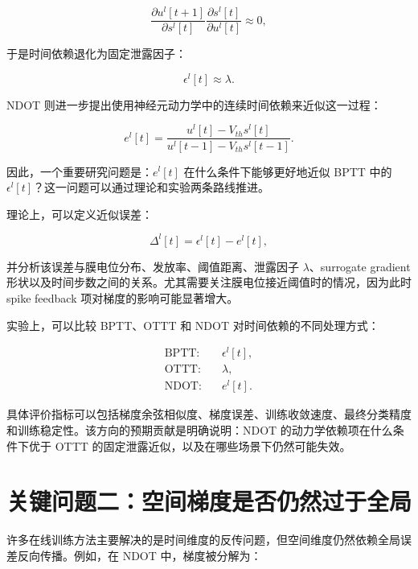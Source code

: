 \documentclass[11pt]{ctexart}
\begin{document}
\begin{equation}
\frac{\partial u^l[t+1]}{\partial s^l[t]}
\frac{\partial s^l[t]}{\partial u^l[t]}
\approx 0,
\end{equation}

于是时间依赖退化为固定泄露因子：

\begin{equation}
\epsilon^l[t] \approx \lambda .
\end{equation}

NDOT 则进一步提出使用神经元动力学中的连续时间依赖来近似这一过程：

\begin{equation}
 e^l[t]
=
\frac{u^l[t]-V_{th}s^l[t]}
{u^l[t-1]-V_{th}s^l[t-1]} .
\end{equation}

因此，一个重要研究问题是：$e^l[t]$ 在什么条件下能够更好地近似 BPTT 中的 $\epsilon^l[t]$？这一问题可以通过理论和实验两条路线推进。

理论上，可以定义近似误差：

\begin{equation}
\Delta^l[t] = \epsilon^l[t] - e^l[t],
\end{equation}

并分析该误差与膜电位分布、发放率、阈值距离、泄露因子 $\lambda$、surrogate gradient 形状以及时间步数之间的关系。尤其需要关注膜电位接近阈值时的情况，因为此时 spike feedback 项对梯度的影响可能显著增大。

实验上，可以比较 BPTT、OTTT 和 NDOT 对时间依赖的不同处理方式：

\begin{equation}
\begin{aligned}
\text{BPTT:} \quad & \epsilon^l[t], \\
\text{OTTT:} \quad & \lambda, \\
\text{NDOT:} \quad & e^l[t].
\end{aligned}
\end{equation}

具体评价指标可以包括梯度余弦相似度、梯度误差、训练收敛速度、最终分类精度和训练稳定性。该方向的预期贡献是明确说明：NDOT 的动力学依赖项在什么条件下优于 OTTT 的固定泄露近似，以及在哪些场景下仍然可能失效。

\section{关键问题二：空间梯度是否仍然过于全局}

许多在线训练方法主要解决的是时间维度的反传问题，但空间维度仍然依赖全局误差反向传播。例如，在 NDOT 中，梯度被分解为：
\end{document}
